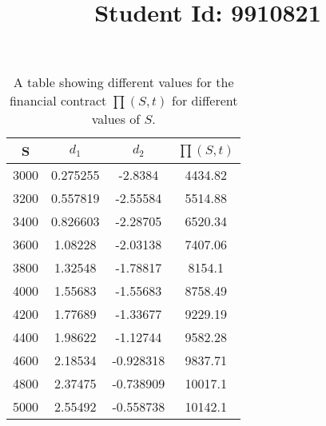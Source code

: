 \documentclass{article}
\begin{document}
\title{Student Id: 9910821}
\date{}

\maketitle

\begin{table}[h!]
\centering
\begin{tabular}{c|c c c }
 S & $ d_1 $ & $ d_2 $ & $\prod(S,t)$\\
 \hline
3000 & 0.275255 & -2.8384 &  4434.82\\
3200 & 0.557819 & -2.55584 &  5514.88\\
3400 & 0.826603 & -2.28705 &  6520.34\\
3600 & 1.08228 & -2.03138 &  7407.06\\
3800 & 1.32548 & -1.78817 &  8154.1\\
4000 & 1.55683 & -1.55683 &  8758.49\\
4200 & 1.77689 & -1.33677 &  9229.19\\
4400 & 1.98622 & -1.12744 &  9582.28\\
4600 & 2.18534 & -0.928318 &  9837.71\\
4800 & 2.37475 & -0.738909 &  10017.1\\
5000 & 2.55492 & -0.558738 &  10142.1\\
\end{tabular}
\caption{A table showing different values for the financial contract $\prod(S,t)$ for different values of $S$.}
\label{table:1}
\end{table}

\lstset{style=mystyle}

\end{document}
